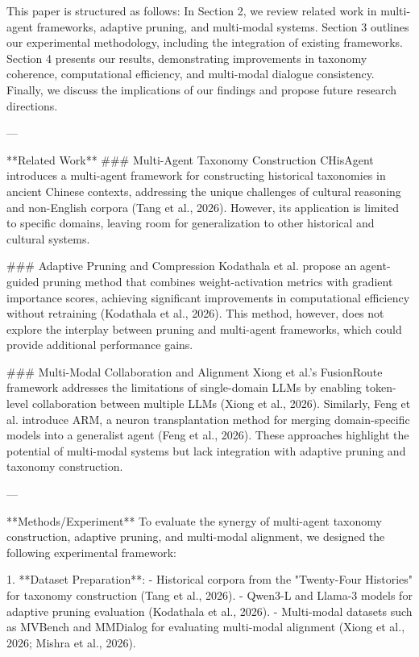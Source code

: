 This paper is structured as follows: In Section 2, we review related work in multi-agent frameworks, adaptive pruning, and multi-modal systems. Section 3 outlines our experimental methodology, including the integration of existing frameworks. Section 4 presents our results, demonstrating improvements in taxonomy coherence, computational efficiency, and multi-modal dialogue consistency. Finally, we discuss the implications of our findings and propose future research directions.  

---

**Related Work**  
### Multi-Agent Taxonomy Construction  
CHisAgent introduces a multi-agent framework for constructing historical taxonomies in ancient Chinese contexts, addressing the unique challenges of cultural reasoning and non-English corpora (Tang et al., 2026). However, its application is limited to specific domains, leaving room for generalization to other historical and cultural systems.

### Adaptive Pruning and Compression  
Kodathala et al. propose an agent-guided pruning method that combines weight-activation metrics with gradient importance scores, achieving significant improvements in computational efficiency without retraining (Kodathala et al., 2026). This method, however, does not explore the interplay between pruning and multi-agent frameworks, which could provide additional performance gains.

### Multi-Modal Collaboration and Alignment  
Xiong et al.'s FusionRoute framework addresses the limitations of single-domain LLMs by enabling token-level collaboration between multiple LLMs (Xiong et al., 2026). Similarly, Feng et al. introduce ARM, a neuron transplantation method for merging domain-specific models into a generalist agent (Feng et al., 2026). These approaches highlight the potential of multi-modal systems but lack integration with adaptive pruning and taxonomy construction.

---

**Methods/Experiment**  
To evaluate the synergy of multi-agent taxonomy construction, adaptive pruning, and multi-modal alignment, we designed the following experimental framework:

1. **Dataset Preparation**:  
   - Historical corpora from the "Twenty-Four Histories" for taxonomy construction (Tang et al., 2026).  
   - Qwen3-L and Llama-3 models for adaptive pruning evaluation (Kodathala et al., 2026).  
   - Multi-modal datasets such as MVBench and MMDialog for evaluating multi-modal alignment (Xiong et al., 2026; Mishra et al., 2026).  

